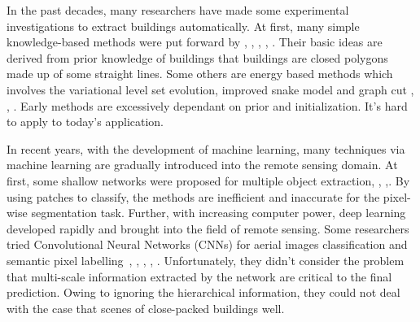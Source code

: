 In the past decades, many researchers have made some experimental investigations to extract buildings automatically. 
At first, many simple knowledge-based methods were put forward by \cite{IEEEexample:huertas1988detecting}, \cite{IEEEexample:noronha2001detection}, \cite{IEEEexample:nosrati2009novel}, \cite{IEEEexample:izadi2012three}, \cite{IEEEexample:wang2015efficient}. 
Their basic ideas are derived from prior knowledge of buildings that buildings are closed polygons made up of some straight lines. 
Some others are energy based methods which involves the variational level set evolution, improved snake model and graph cut \cite{IEEEexample:cote2013automatic}, \cite{IEEEexample:peng2005improved}, \cite{IEEEexample:sirmacek2009urban}. Early methods are excessively dependant on prior and initialization. It's hard to apply to today's application.


In recent years, with the development of machine learning, many techniques via machine learning are gradually introduced into the remote sensing domain.
At first, some shallow networks were proposed for multiple object extraction\cite{IEEEexample:mnih2013machine}, \cite{IEEEexample:saito2016multiple}, \cite{IEEEexample:alshehhi2017simultaneous},\cite{IEEEexample:zhao2017contextually}. By using patches to classify, the methods are inefficient and inaccurate for the pixel-wise segmentation task.
Further, with increasing computer power, deep learning developed rapidly and brought into the field of remote sensing. Some researchers tried Convolutional Neural Networks (CNNs) for aerial images classification and semantic pixel labelling~\cite{IEEEexample:paisitkriangkrai2015effective}, \cite{IEEEexample:liu2017dense}, \cite{IEEEexample:audebert2017deep}, \cite{IEEEexample:kampffmeyer2017urban}, \cite{IEEEexample:he2017multi}. Unfortunately, they didn't consider the problem that multi-scale information extracted by the network are critical to the final prediction. Owing to ignoring the hierarchical information, they could not deal with the case that scenes of close-packed buildings well.



